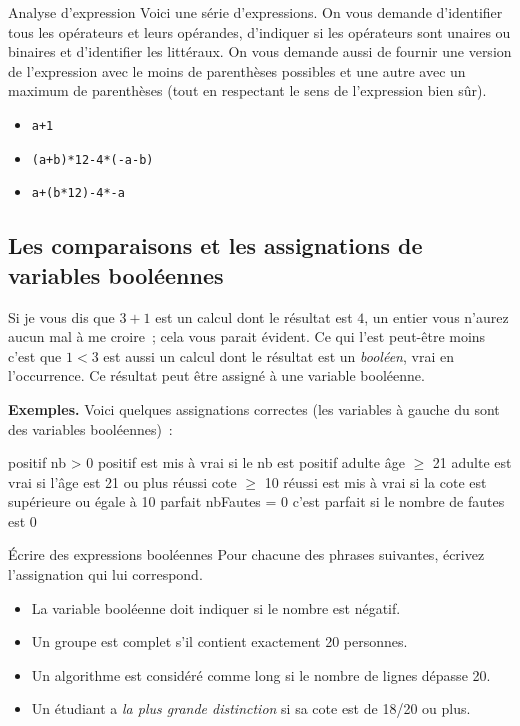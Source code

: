 			\begin{Exercice}{Analyse d’expression}
				Voici une série d’expressions.
				On vous demande d’identifier tous les opérateurs
				et leurs opérandes, 
				d’indiquer si les opérateurs sont unaires ou binaires
				et d’identifier les littéraux.
				On vous demande aussi de fournir une version de l’expression
				avec le moins de parenthèses possibles et 
				une autre avec un maximum de parenthèses
				(tout en respectant le sens de l’expression bien sûr).
				\begin{itemize}
				\item \Verb_a+1_
				\item \Verb_(a+b)*12-4*(-a-b)_ 
				\item \Verb_a+(b*12)-4*-a_ 
				\end{itemize}
			\end{Exercice}
			
		\subsection{Les comparaisons et les assignations de variables booléennes}
		
			Si je vous dis que $3+1$ est un calcul
			dont le résultat est $4$, un entier
			vous n’aurez aucun mal à me croire~; 
			cela vous parait évident.
			Ce qui l’est peut-être moins c’est que $1<3$ est aussi
			un calcul dont le résultat est un \emph{booléen},
			vrai en l’occurrence. 
			Ce résultat peut être assigné à une variable booléenne.			

			\textbf{Exemples.}
			Voici quelques assignations correctes 
			(les variables à gauche du \Gets sont des variables booléennes)~:
			\begin{LDA}
				\Let positif \Gets nb > 0 \RComment positif est mis à vrai si le nb est positif 
				\Let adulte \Gets âge $\ge$ 21 \RComment adulte est vrai si l’âge est 21 ou plus
				\Let réussi \Gets cote $\ge$ 10 \RComment réussi est mis à vrai si la cote est supérieure ou égale à 10
				\Let parfait \Gets nbFautes = 0 \RComment c’est parfait si le nombre de fautes est 0
			\end{LDA}
		
			\begin{Exercice}{Écrire des expressions booléennes}
				Pour chacune des phrases suivantes,
				écrivez l’assignation qui lui correspond.
				\begin{itemize}
				\item 
					La variable booléenne 
					doit indiquer si le nombre  est négatif.
				\item
					Un groupe est complet s’il contient exactement 20 personnes.
				\item
					Un algorithme est considéré comme long si le nombre de lignes
					dépasse 20.
				\item 
					Un étudiant a \emph{la plus grande distinction} si sa cote est
					de 18/20 ou plus.
				\end{itemize}
			\end{Exercice}

